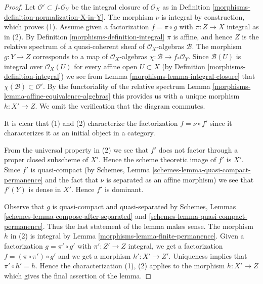\begin{proof}

Let $\mathcal{O}' \subset f_*\mathcal{O}_Y$ be the integral closure of
$\mathcal{O}_X$ as in Definition \ref{morphisms-definition-normalization-X-in-Y}.
The morphism $\nu$ is integral by construction, which proves (1).
Assume given a factorization $f = \pi \circ g$ with $\pi : Z \to X$
integral as in (2). By Definition \ref{morphisms-definition-integral}
$\pi$ is affine, and hence $Z$ is the relative
spectrum of a quasi-coherent sheaf of $\mathcal{O}_X$-algebras $\mathcal{B}$.
The morphism $g : Y \to Z$ corresponds to a map of $\mathcal{O}_X$-algebras
$\chi : \mathcal{B} \to f_*\mathcal{O}_Y$. Since $\mathcal{B}(U)$ is
integral over $\mathcal{O}_X(U)$ for every affine open $U \subset X$
(by Definition \ref{morphisms-definition-integral})
we see from Lemma \ref{morphisms-lemma-integral-closure}
that $\chi(\mathcal{B}) \subset \mathcal{O}'$.
By the functoriality of the relative spectrum
Lemma \ref{morphisms-lemma-affine-equivalence-algebras}
this provides us with a unique morphism
$h : X' \to Z$. We omit the verification that the diagram commutes.

\medskip\noindent
It is clear that (1) and (2) characterize the factorization $f = \nu \circ f'$
since it characterizes it as an initial object in a category.

\medskip\noindent
From the universal property in (2) we see that $f'$ does not factor through
a proper closed subscheme of $X'$. Hence the scheme theoretic image of $f'$
is $X'$. Since $f'$ is quasi-compact (by Schemes, Lemma
\ref{schemes-lemma-quasi-compact-permanence} and the fact that $\nu$ is
separated as an affine morphism) we see that $f'(Y)$ is dense in $X'$.
Hence $f'$ is dominant.

\medskip\noindent
Observe that $g$ is quasi-compact and quasi-separated by
Schemes, Lemmas \ref{schemes-lemma-compose-after-separated} and
\ref{schemes-lemma-quasi-compact-permanence}. Thus the last statement
of the lemma makes sense.
The morphism $h$ in (2) is integral by Lemma \ref{morphisms-lemma-finite-permanence}.
Given a factorization $g = \pi' \circ g'$ with $\pi' : Z' \to Z$
integral, we get a factorization $f = (\pi \circ \pi') \circ g'$ and
we get a morphism $h' : X' \to Z'$. Uniqueness implies that
$\pi' \circ h' = h$. Hence the characterization (1), (2) applies
to the morphism $h : X' \to Z$ which gives the final assertion of the lemma.
\end{proof}

